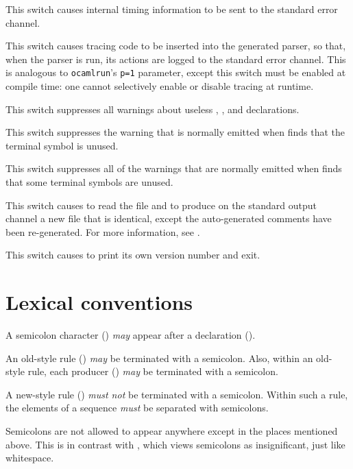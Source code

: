 \documentclass[onecolumn,11pt,nocopyrightspace,preprint]{sigplanconf}
\begin{document}
\docswitch{\otimings} This switch causes internal timing information to
be sent to the standard error channel.

\docswitch{\otrace} This switch causes tracing code to be inserted into
the generated parser, so that, when the parser is run, its actions are
logged to the standard error channel. This is analogous to \texttt{ocamlrun}'s
\texttt{p=1} parameter, except this switch must be enabled at compile time:
one cannot selectively enable or disable tracing at runtime.

\docswitch{\oignoreprec} This switch suppresses all warnings about
useless \dleft, \dright, \dnonassoc and \dprec declarations.

 This switch suppresses the warning that
is normally emitted when \menhir finds that the terminal symbol  is
unused.

\docswitch{\oignoreall} This switch suppresses all of the warnings that are
normally emitted when \menhir finds that some terminal symbols are unused.

 This switch causes \menhir to
read the \messages file  and to produce on the standard output
channel a new \messages file that is identical, except the auto-generated
comments have been re-generated. For more information,
see .

\docswitch{\oversion} This switch causes \menhir to print its own version
number and exit.


\section{Lexical conventions}

A semicolon character (\kw{;}) \emph{may} appear after a declaration
().

An old-style rule () \emph{may} be terminated with a
semicolon. Also, within an old-style rule, each producer
() \emph{may} be terminated with a semicolon.

A new-style rule () \emph{must not} be terminated with a
semicolon. Within such a rule, the elements of a sequence \emph{must} be
separated with semicolons.

Semicolons are not allowed to appear anywhere except in the places mentioned
above. This is in contrast with \ocamlyacc, which views semicolons as
insignificant, just like whitespace.
\end{document}
